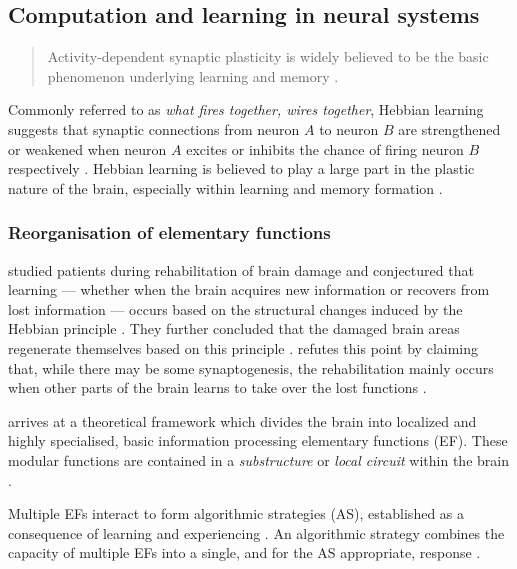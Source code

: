 \documentclass[a4paper,oneside]{memoir}
\begin{document}
\subsection{Computation and learning in neural systems}
\begin{quote}
  Activity-dependent synaptic plasticity is widely believed to be the basic
  phenomenon underlying learning and memory \autocite{dayan2001}.
\end{quote}

Commonly referred to as \textit{what fires together, wires together}, Hebbian
learning suggests that synaptic connections from neuron $A$ to neuron $B$
are strengthened or weakened when neuron $A$ excites or inhibits the chance of
firing neuron $B$ respectively \autocite{dayan2001}.
Hebbian learning is believed to play a large part in the plastic nature of the
brain, especially within learning and memory formation
\autocite{dayan2001, Johnston2009, Robertson1999}.

\subsubsection{Reorganisation of elementary functions}
\label{ref}

\autocite{Robertson1999} studied patients during
rehabilitation of brain damage and conjectured that learning --- whether when the
brain acquires new information or recovers from lost information --- occurs based
on the structural changes induced by the Hebbian principle
\autocite{Robertson1999}. They further concluded that the damaged brain areas
regenerate themselves based on this principle \autocite{Robertson1999}.
\autocite{Mogensen2011} refutes this point by claiming that, while there
may be some synaptogenesis, the rehabilitation mainly occurs when other parts
of the brain learns to take over the lost functions \autocite{Mogensen2011}.

\autocite{Mogensen2011} arrives at a theoretical framework which divides the
brain into localized and highly specialised, basic information
processing elementary functions (EF). These modular functions are contained
in a \textit{substructure} or \textit{local circuit}
within the brain \autocite{Mogensen2011}.

Multiple EFs interact to form algorithmic strategies (AS), established as
a consequence of learning and experiencing \autocite{Mogensen2011}. An
algorithmic strategy combines the capacity of multiple EFs into a single, and
for the AS appropriate, response \autocite{Mogensen2011, Mogensen2012b}.
\end{document}
